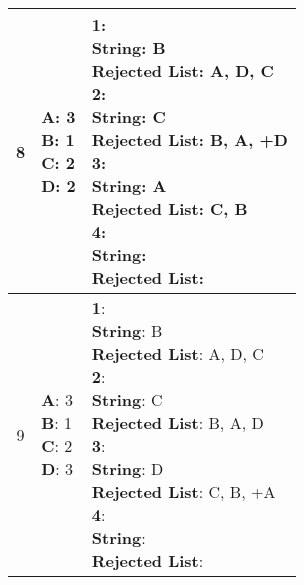 \documentclass{article}
\begin{document}
\begin{center}
\begin{longtable}{ c|l|l }
        8 & \makecell{\textbf{A}: 3 \\ \textbf{B}: 1 \\ \textbf{C}: 2 \\ \textbf{D}: 2} &  
        \makecell{\textbf{1}:\\ \hspace{10mm} \textbf{String}: B \\ \hspace{10mm} \textbf{Rejected List}: A, D, C \\
                    \textbf{2}:\\ \hspace{10mm} \textbf{String}: C \\ \hspace{10mm} \textbf{Rejected List}: B, A, +D \\
                    \textbf{3}:\\ \hspace{10mm} \textbf{String}: A \\ \hspace{10mm} \textbf{Rejected List}: C, B\\
                    \textbf{4}:\\ \hspace{10mm} \textbf{String}:  \\ \hspace{10mm} \textbf{Rejected List}: \\} \\
        \hline 

        9 & \makecell{\textbf{A}: 3 \\ \textbf{B}: 1 \\ \textbf{C}: 2 \\ \textbf{D}: 3} &  
        \makecell{\textbf{1}:\\ \hspace{10mm} \textbf{String}: B \\ \hspace{10mm} \textbf{Rejected List}: A, D, C \\
                    \textbf{2}:\\ \hspace{10mm} \textbf{String}: C \\ \hspace{10mm} \textbf{Rejected List}: B, A, D \\
                    \textbf{3}:\\ \hspace{10mm} \textbf{String}: D \\ \hspace{10mm} \textbf{Rejected List}: C, B, +A\\
                    \textbf{4}:\\ \hspace{10mm} \textbf{String}:  \\ \hspace{10mm} \textbf{Rejected List}: \\} \\
        \hline 


\end{longtable}
\end{center}
\end{document}
